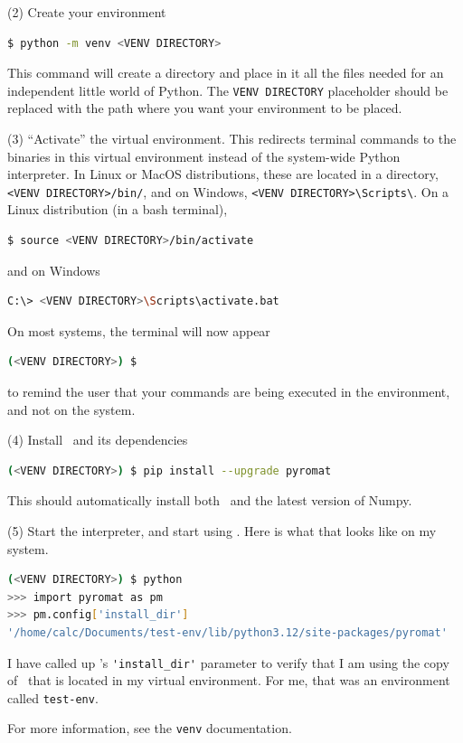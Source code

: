 (2) Create your environment
\begin{lstlisting}[language=bash]
$ python -m venv <VENV DIRECTORY>
\end{lstlisting}
This command will create a directory and place in it all the files needed for an independent little world of Python.  The \texttt{VENV DIRECTORY} placeholder should be replaced with the path where you want your environment to be placed.

(3) ``Activate'' the virtual environment.  This redirects terminal commands to the binaries in this virtual environment instead of the system-wide Python interpreter.  In Linux or MacOS distributions, these are located in a directory, \texttt{<VENV DIRECTORY>/bin/}, and on Windows, \verb|<VENV DIRECTORY>\Scripts\|.  On a Linux distribution (in a bash terminal), 
\begin{lstlisting}[language=bash]
$ source <VENV DIRECTORY>/bin/activate
\end{lstlisting}
and on Windows
\begin{lstlisting}[language=bash]
C:\> <VENV DIRECTORY>\Scripts\activate.bat
\end{lstlisting}

On most systems, the terminal will now appear
\begin{lstlisting}[language=bash]
(<VENV DIRECTORY>) $
\end{lstlisting}
to remind the user that your commands are being executed in the environment, and not on the system.

(4) Install \PM\ and its dependencies
\begin{lstlisting}[language=bash]
(<VENV DIRECTORY>) $ pip install --upgrade pyromat
\end{lstlisting}
This should automatically install both \PM\ and the latest version of Numpy.

(5) Start the interpreter, and start using \PM.  Here is what that looks like on my system.
\begin{lstlisting}[language=bash]
(<VENV DIRECTORY>) $ python
>>> import pyromat as pm
>>> pm.config['install_dir']
'/home/calc/Documents/test-env/lib/python3.12/site-packages/pyromat'
\end{lstlisting}
I have called up \PM's \verb|'install_dir'| parameter to verify that I am using the copy of \PM\ that is located in my virtual environment.  For me, that was an environment called \texttt{test-env}.

For more information, see the \texttt{venv} documentation.

